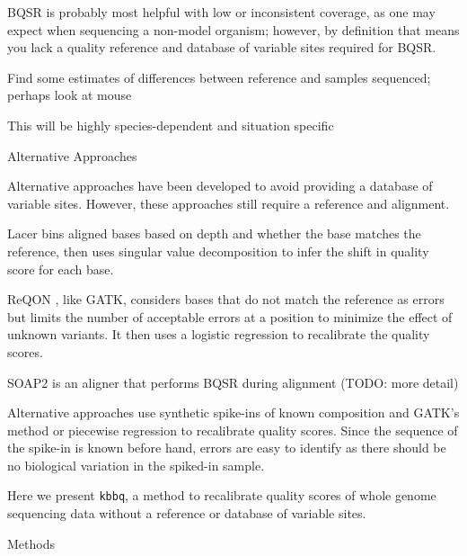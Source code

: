\documentclass{article}
\begin{document}
\begin{outline}
\begin{outline}
\begin{outline}
		\end{outline}
		\item BQSR is probably most helpful with low or inconsistent coverage, as one may expect when sequencing a non-model organism; however, by definition that means you lack a quality reference and database of variable sites required for BQSR.
			\begin{outline}
				\item Find some estimates of differences between reference and samples sequenced; perhaps look at mouse
				\item This will be highly species-dependent and situation specific
			\end{outline}
		\item Alternative Approaches
			\begin{outline}
			\item Alternative approaches have been developed to avoid providing a database of variable sites. However, these approaches still require a reference and alignment.
			\item Lacer \parencite{chung_lacer:_2017} bins aligned bases based on depth and whether the base matches the reference, then uses singular value decomposition to infer the shift in quality score for each base.
			\item ReQON \parencite{cabanski_reqon:_2012}, like GATK, considers bases that do not match the reference as errors but limits the number of acceptable errors at a position to minimize the effect of unknown variants. It then uses a logistic regression to recalibrate the quality scores.
			\item SOAP2 \parencite{li_soap2:_2009} is an aligner that performs BQSR during alignment (TODO: more detail)
			\item Alternative approaches use synthetic spike-ins of known composition and GATK's method \parencite{zook_synthetic_2012} or piecewise regression \parencite{ni_improvement_2016} to recalibrate quality scores. Since the sequence of the spike-in is known before hand, errors are easy to identify as there should be no biological variation in the spiked-in sample.
			\end{outline}
		\item Here we present \texttt{kbbq}, a method to recalibrate quality scores of whole genome sequencing data without a reference or database of variable sites.
	\end{outline}
	\item Methods
	\begin{outline}

\end{outline}
\end{outline}
\end{document}
